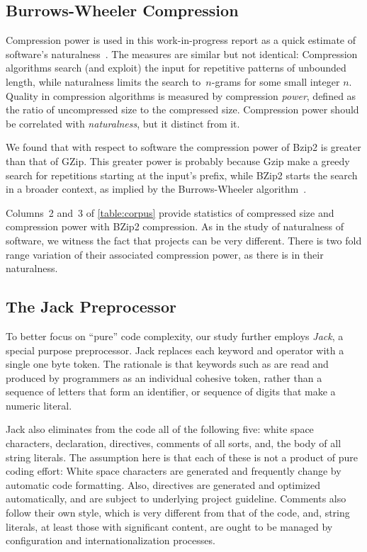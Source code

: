 \subsection{Burrows-Wheeler Compression}
Compression power is used in this work-in-progress report as a quick estimate
of software's naturalness~\cite{Hindle:Bar:Su:Gabel:Devanbu:2012}.  The
measures are similar but not identical: Compression algorithms search
(and exploit) the input for repetitive patterns of unbounded length, while
naturalness limits the search to~$n$-grams for some small integer $n$.  Quality
in compression algorithms is measured by compression \emph{power}, defined as
the ratio of uncompressed size to the compressed size. Compression power should
be correlated with \emph{naturalness}, but it distinct from it.

We found that with respect to \Java software the compression power of Bzip2 is
greater than that of GZip. This greater power is probably because Gzip make a
greedy search for repetitions starting at the input's prefix, while BZip2
starts the search in a broader context, as implied by the Burrows-Wheeler
algorithm~\cite{Burrows:Wheeler:94}.

Columns~2 and~3 of \cref{table:corpus} provide statistics of compressed size and
compression power with BZip2 compression. As in the
study of naturalness of software, we witness the fact that projects can be very 
different. There is two fold range variation of their associated compression
power, as there is in their naturalness.

\subsection{The Jack Preprocessor}

To better focus on ``pure''  code complexity, our study further employs \emph{Jack},
a special purpose preprocessor. Jack replaces each keyword and operator with a
single one byte token. The rationale is that keywords such as  are
read and produced by programmers as an individual cohesive token, rather than a
sequence of letters that form an identifier, or sequence of digits that make a
numeric literal.

Jack also eliminates from the \Java code all of the following five: white space
characters,  declaration,  directives, comments of all
sorts, and, the body of all string literals.  The assumption here is that each
of these is not a product of pure coding effort: White space characters are
generated and frequently change by automatic code formatting. Also, 
directives are generated and optimized automatically, and are subject to
underlying project guideline. Comments also follow their own style, which is
very different from that of the code, and, string literals, at least those with
significant content, are ought to be managed by configuration and
internationalization processes. 

